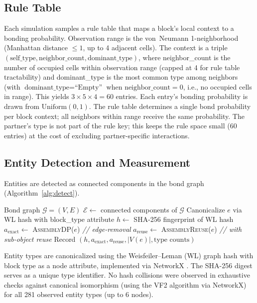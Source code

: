 \documentclass[letterpaper]{article}
\begin{document}
\subsection{Rule Table}

Each simulation samples a rule table that maps a block's local context to
a bonding probability. Observation range is the von~Neumann
1-neighborhood (Manhattan distance $\leq 1$, up to 4 adjacent cells).
The context is a triple
$(\text{self\_type}, \text{neighbor\_count}, \text{dominant\_type})$,
where neighbor\_count is the number of occupied cells within observation
range (capped at 4 for rule table tractability) and dominant\_type is the
most common type among neighbors (with $\text{dominant\_type} = \text{``Empty''}$
when $\text{neighbor\_count} = 0$, i.e., no occupied cells in range).
This yields $3 \times 5 \times 4 = 60$ entries.
Each entry's bonding probability is drawn from $\text{Uniform}(0,1)$.
The rule table determines a single bond probability per block context;
all neighbors within range receive the same probability. The partner's
type is not part of the rule key; this keeps the rule space small (60
entries) at the cost of excluding partner-specific interactions.

\subsection{Entity Detection and Measurement}

Entities are detected as connected components in the bond graph
(Algorithm~\ref{alg:detect}).

\begin{algorithm}[t]
\caption{Entity detection and AT measurement}
\label{alg:detect}
\begin{algorithmic}[1]
\REQUIRE Bond graph $\mathcal{G} = (V, E)$
\STATE $\mathcal{E} \gets$ connected components of $\mathcal{G}$
  \STATE Canonicalize $e$ via WL hash with block\_type attribute
  \STATE $h \gets$ SHA-256 fingerprint of WL hash
  \STATE $a_{\text{exact}} \gets$ \textsc{AssemblyDP}($e$) \hfill \textit{// edge-removal}
  \STATE $a_{\text{reuse}} \gets$ \textsc{AssemblyReuse}($e$) \hfill \textit{// with sub-object reuse}
  \STATE Record $(h, a_{\text{exact}}, a_{\text{reuse}}, |V(e)|, \text{type counts})$
\ENDFOR
\end{algorithmic}
\end{algorithm}

Entity types are canonicalized using the Weisfeiler--Leman (WL) graph
hash \citep{weisfeiler1968reduction} with block type as a node
attribute, implemented via NetworkX \citep{hagberg2008networkx}. The
SHA-256 digest serves as a unique type identifier. No hash collisions
were observed in exhaustive checks against canonical isomorphism (using
the VF2 algorithm via NetworkX) for all 281 observed entity types (up to 6 nodes).
\end{document}
